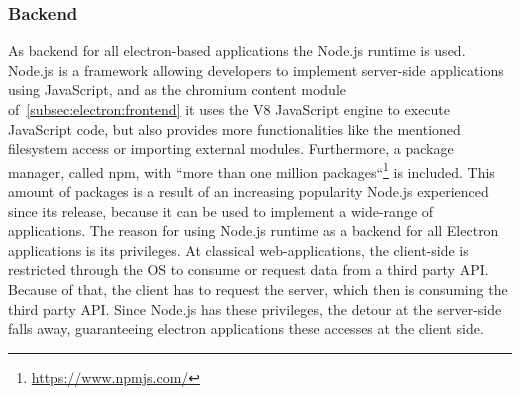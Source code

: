 \subsubsection{Backend}
\label{subsec:electron:backend}
As backend for all electron-based applications the Node.js runtime is used.
Node.js is a framework allowing developers to implement server-side applications using JavaScript, and as the chromium content module of~\ref{subsec:electron:frontend} it uses the V8 JavaScript engine to execute JavaScript code, but also provides more functionalities like the mentioned filesystem access
or importing external modules.
Furthermore, a package manager, called \ac{npm}, with ``more than one million packages``\footnote{\url{https://www.npmjs.com/}} is included.
This amount of packages is a result of an increasing popularity Node.js experienced since its release, because it can be used to implement a wide-range of applications.
The reason for using Node.js runtime as a backend for all Electron applications is its privileges.
At classical web-applications, the client-side is restricted through the OS to consume or request data from a third party API\@.
Because of that, the client has to request the server, which then is consuming the third party API\@.
Since Node.js has these privileges, the detour at the server-side falls away, guaranteeing electron applications these accesses at the client side.



